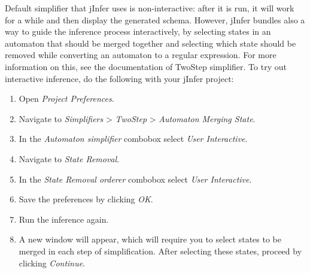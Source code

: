 \documentclass[a4paper,10pt,oneside]{article}
\begin{document}
\par 
  Default simplifier that jInfer uses is non-interactive: after it is run, it will
work for a while and then display the generated schema. However, jInfer bundles also
a way to guide the inference process interactively, by selecting states in an
automaton that should be merged together and selecting which state should be
removed while converting an automaton to a regular expression. For more
information on this, see the documentation of TwoStep simplifier.
To try out interactive inference, do the following with your jInfer project:

\begin{enumerate}
  \item Open \textit{Project Preferences}.
  \item Navigate to \textit{Simplifiers} > \textit{TwoStep} >
      \textit{Automaton Merging State}.
  \item In the \textit{Automaton simplifier} combobox select
      \textit{User Interactive}.
  \item Navigate to \textit{State Removal}.
  \item In the \textit{State Removal orderer} combobox select
      \textit{User Interactive}.
  \item Save the preferences by clicking \textit{OK}.
  \item Run the inference again.
  \item A new window will appear, which will require you
      to select states to be merged in each step of simplification.
      After selecting these states, proceed by clicking \textit{Continue}.
\end{enumerate}


 
\end{document}
